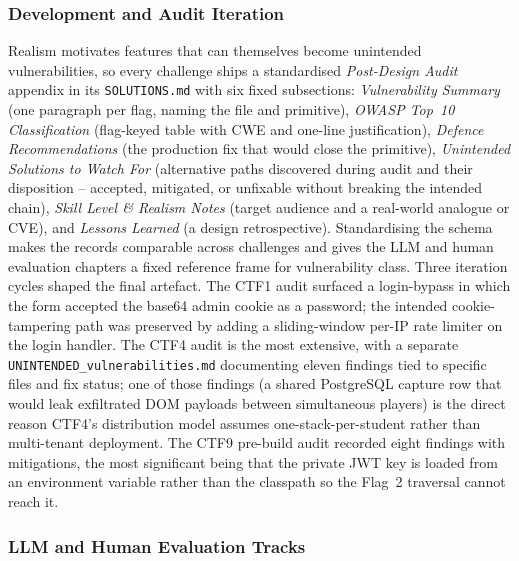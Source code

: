 \subsubsection{Development and Audit Iteration}
\label{sec:dev-audit}

Realism motivates features that can themselves become
unintended vulnerabilities, so every challenge ships a
standardised \textit{Post-Design Audit} appendix in its
\texttt{SOLUTIONS.md} with six fixed subsections:
\textit{Vulnerability Summary} (one paragraph per flag,
naming the file and primitive), \textit{OWASP Top~10
Classification} (flag-keyed table with CWE and one-line
justification), \textit{Defence Recommendations} (the
production fix that would close the primitive),
\textit{Unintended Solutions to Watch For} (alternative
paths discovered during audit and their disposition --
accepted, mitigated, or unfixable without breaking the
intended chain), \textit{Skill Level \& Realism Notes}
(target audience and a real-world analogue or CVE), and
\textit{Lessons Learned} (a design retrospective).
Standardising the schema makes the records comparable
across challenges and gives the LLM and human evaluation
chapters a fixed reference frame for vulnerability class.
Three iteration cycles shaped the final artefact. The CTF1
audit surfaced a login-bypass in which the form accepted
the base64 admin cookie as a password; the intended
cookie-tampering path was preserved by adding a
sliding-window per-IP rate limiter on the login handler.
The CTF4 audit is the most extensive, with a separate
\texttt{UNINTENDED\_vulnerabilities.md} documenting eleven
findings tied to specific files and fix status; one of those
findings (a shared PostgreSQL capture row that would leak
exfiltrated DOM payloads between simultaneous players) is the
direct reason CTF4's distribution model assumes
one-stack-per-student rather than multi-tenant deployment. The CTF9 pre-build audit recorded eight findings
with mitigations, the most significant being that the
private JWT key is loaded from an environment variable
rather than the classpath so the Flag~2 traversal cannot
reach it.

\subsubsection{LLM and Human Evaluation Tracks}

